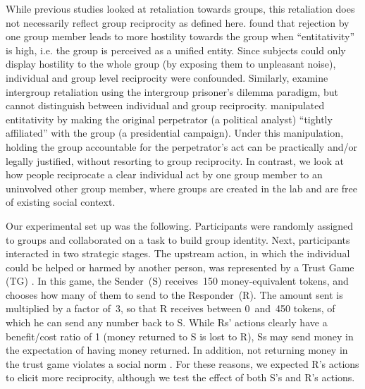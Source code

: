\documentclass[12pt,a4paper]{article}\usepackage[]{graphicx}\usepackage[]{color}
\begin{document}
While previous studies looked at retaliation towards groups, this retaliation does not necessarily reflect group reciprocity as defined here. \citet{gaertner2008whenrejection} found that rejection by one group member leads to more hostility towards the group when ``entitativity'' is high, i.e. the group is perceived as a unified entity. Since subjects could only display hostility to the whole group (by exposing them to unpleasant noise), individual and group level reciprocity were confounded. Similarly, \citet{bohm2016makes} examine intergroup retaliation using the intergroup prisoner's
dilemma para\-digm, but cannot distinguish between individual and group reciprocity.
\citet{stenstrom2008theroles} manipulated entitativity by making the original perpetrator (a political analyst) ``tightly affiliated'' with the group (a presidential campaign). Under this manipulation, holding the group accountable for the perpetrator's act can be practically and/or legally justified, without resorting to group reciprocity. In contrast, we look at how people reciprocate a clear individual act by one group member to an uninvolved other group member, where groups are created in the lab and are free of existing social context. 


Our experimental set up was the following. Participants were randomly assigned to groups and collaborated on a task to build group identity. Next, participants interacted in two strategic stages. The upstream action, in which the individual could be helped or harmed by another person, was represented by a Trust Game (TG) \citep{berg1995trust}.  In this game, the Sender~(S) receives~150 money-equivalent tokens, and chooses how many of them to send to the Responder~(R). The amount sent is multiplied by a factor of~3, so that R receives between 0~and~450 tokens, of which he can send any number back to S.  While
Rs' actions clearly have a benefit/cost ratio of 1 (money returned to S is lost to R), Ss may send money in the expectation of having
money returned. In addition, not returning money in the trust game violates a social norm \citep{kimbrough2015norms}. For
these reasons, we expected R's actions to elicit more reciprocity, although we test the effect of both S's and R's actions.


\end{document}
